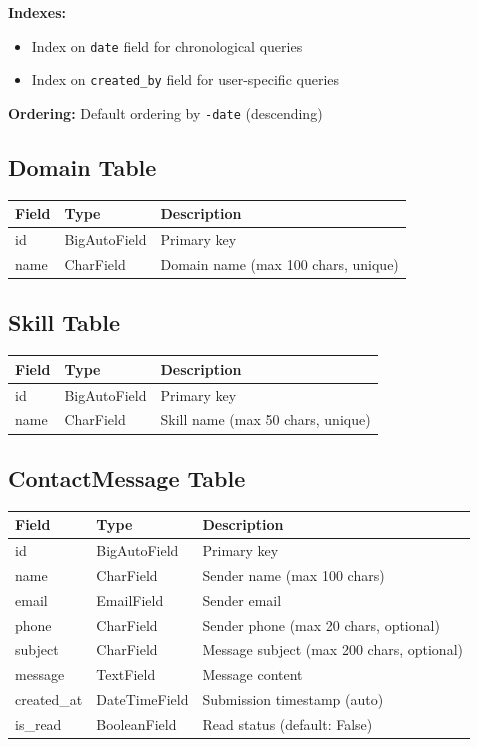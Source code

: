 \documentclass[11pt,a4paper]{article}
\begin{document}
\textbf{Indexes:}
\begin{itemize}[leftmargin=*]
    \item Index on \texttt{date} field for chronological queries
    \item Index on \texttt{created\_by} field for user-specific queries
\end{itemize}

\textbf{Ordering:} Default ordering by \texttt{-date} (descending)

\subsection{Domain Table}
\begin{tabular}{|p{3cm}|p{3cm}|p{8cm}|}
\hline
\textbf{Field} & \textbf{Type} & \textbf{Description} \\
\hline
id & BigAutoField & Primary key \\
\hline
name & CharField & Domain name (max 100 chars, unique) \\
\hline
\end{tabular}


\subsection{Skill Table}
\begin{tabular}{|p{3cm}|p{3cm}|p{8cm}|}
\hline
\textbf{Field} & \textbf{Type} & \textbf{Description} \\
\hline
id & BigAutoField & Primary key \\
\hline
name & CharField & Skill name (max 50 chars, unique) \\
\hline
\end{tabular}

\subsection{ContactMessage Table}
\begin{tabular}{|p{3cm}|p{3cm}|p{8cm}|}
\hline
\textbf{Field} & \textbf{Type} & \textbf{Description} \\
\hline
id & BigAutoField & Primary key \\
\hline
name & CharField & Sender name (max 100 chars) \\
\hline
email & EmailField & Sender email \\
\hline
phone & CharField & Sender phone (max 20 chars, optional) \\
\hline
subject & CharField & Message subject (max 200 chars, optional) \\
\hline
message & TextField & Message content \\
\hline
created\_at & DateTimeField & Submission timestamp (auto) \\
\hline
is\_read & BooleanField & Read status (default: False) \\
\hline
\end{tabular}
\end{document}
